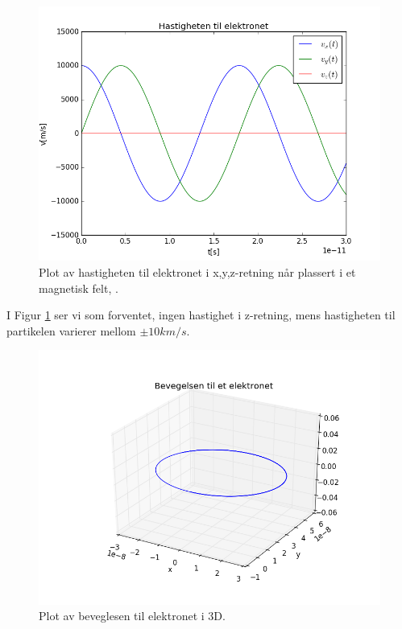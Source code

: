 \documentclass[a4paper,norsk,12pt]{article}
\begin{document}
\begin{figure}[H]
  \includegraphics[width=\linewidth]{oppgave22.png}
  \caption{Plot av hastigheten til elektronet i x,y,z-retning når plassert i et magnetisk felt, .}
  \label{fig:plot2}
\end{figure}

I Figur \ref{fig:plot2} ser vi som forventet, ingen hastighet i z-retning, mens hastigheten til partikelen varierer mellom $ \pm 10km/s$. 


\begin{figure}[H]
  \includegraphics[width=\linewidth]{oppgave23.png}
  \caption{Plot av beveglesen til elektronet i 3D.}
  \label{fig:plot3}
\end{figure}
\end{document}
